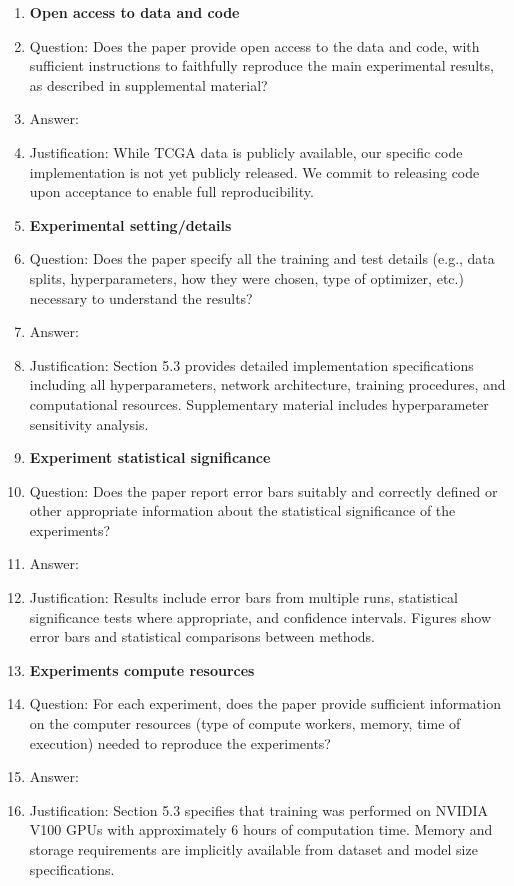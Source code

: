 \documentclass{article}
\begin{document}
\begin{enumerate}
\item {\bf Open access to data and code}
    \item[] Question: Does the paper provide open access to the data and code, with sufficient instructions to faithfully reproduce the main experimental results, as described in supplemental material?
    \item[] Answer: \answerNo{}
    \item[] Justification: While TCGA data is publicly available, our specific code implementation is not yet publicly released. We commit to releasing code upon acceptance to enable full reproducibility.

\item {\bf Experimental setting/details}
    \item[] Question: Does the paper specify all the training and test details (e.g., data splits, hyperparameters, how they were chosen, type of optimizer, etc.) necessary to understand the results?
    \item[] Answer: \answerYes{}
    \item[] Justification: Section 5.3 provides detailed implementation specifications including all hyperparameters, network architecture, training procedures, and computational resources. Supplementary material includes hyperparameter sensitivity analysis.

\item {\bf Experiment statistical significance}
    \item[] Question: Does the paper report error bars suitably and correctly defined or other appropriate information about the statistical significance of the experiments?
    \item[] Answer: \answerYes{}
    \item[] Justification: Results include error bars from multiple runs, statistical significance tests where appropriate, and confidence intervals. Figures show error bars and statistical comparisons between methods.

\item {\bf Experiments compute resources}
    \item[] Question: For each experiment, does the paper provide sufficient information on the computer resources (type of compute workers, memory, time of execution) needed to reproduce the experiments?
    \item[] Answer: \answerYes{}
    \item[] Justification: Section 5.3 specifies that training was performed on NVIDIA V100 GPUs with approximately 6 hours of computation time. Memory and storage requirements are implicitly available from dataset and model size specifications.


\end{enumerate}
\end{document}
